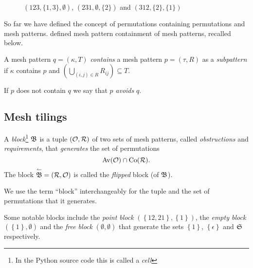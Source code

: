 \begin{figure}[htbp]
  \center
  \caption{$(123, \{ 1, 3 \}, \emptyset)$, $(231, \emptyset, \{ 2 \})$ and $(312, \{ 2 \}, \{ 1 \})$}
  \label{figure: Examples of vincular, covincular and bivincular permutation patterns}
\end{figure}

So far we have defined the concept of permutations containing permutations and 
mesh patterns. \textcite{tannock_equivalence_2018} defined mesh pattern 
containment of mesh patterns, recalled below.

\begin{definition}
  A mesh pattern $q = (\kappa, T)$ \emph{contains} a mesh pattern $p = 
  (\tau, R)$ as a \emph{subpattern} if $\kappa$ contains $p$ and $\left( 
  \bigcup_{(i,j) \in R}{R_{ij}} \right) \subseteq T$.
\end{definition}

If $p$ does not contain $q$ we say that $p$ \emph{avoids} $q$.


\subsection{Mesh tilings}

\begin{definition}\label{definition:block}
  A \emph{block}\footnote{In the Python source code this is called a 
  \emph{cell}} $\mf{B}$ is a tuple $(\mc{O}, \mc{R})$ of two sets of 
  mesh patterns, called \emph{obstructions} and \emph{requirements}, that 
  \emph{generates} the set of permutations \[ \Av{\mc{O}} \cap \Co{\mc{R}} .\]
  The block $\overset{\leftharpoonup}{\mf{B}} = (\mc{R}, \mc{O})$ is called the 
  \emph{flipped} block (of $\mf{B}$).
\end{definition}

We use the term ``block'' interchangeably for the tuple and the set of 
permutations that it generates. 

\begin{example}
  Some notable blocks include the \emph{point block} $(\left\{ 12, 21 \right\}, 
  \left\{ 1 \right\})$, the \emph{empty block} $(\left\{ 1 \right\}, \emptyset)$ 
  and the \emph{free block} $(\emptyset, \emptyset)$ that generate the sets 
  $\left\{ 1 \right\}$, $\left\{ \epsilon \right\}$ and $\S$ respectively.
\end{example}

